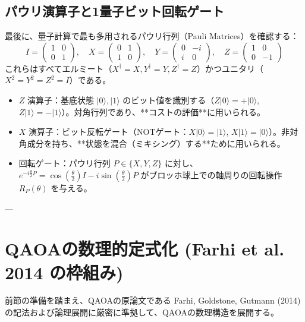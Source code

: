 \documentclass[11pt,a4paper]{ltjsarticle}
\theoremstyle{definition}
\theoremstyle{plain}
\theoremstyle{remark}
\newcommand{\ket}[1]{|#1\rangle}
\begin{document}
\subsection{パウリ演算子と1量子ビット回転ゲート}
最後に、量子計算で最も多用されるパウリ行列（Pauli Matrices）を確認する：
\begin{equation}
I = \begin{pmatrix} 1 & 0 \\ 0 & 1 \end{pmatrix}, \quad 
X = \begin{pmatrix} 0 & 1 \\ 1 & 0 \end{pmatrix}, \quad 
Y = \begin{pmatrix} 0 & -i \\ i & 0 \end{pmatrix}, \quad 
Z = \begin{pmatrix} 1 & 0 \\ 0 & -1 \end{pmatrix}
\end{equation}
これらはすべてエルミート（$X^\dagger = X, Y^\dagger = Y, Z^\dagger = Z$）かつユニタリ（$X^2 = Y^2 = Z^2 = I$）である。
\begin{itemize}
    \item $Z$ 演算子：基底状態 $\ket{0}, \ket{1}$ のビット値を識別する（$Z\ket{0}=+\ket{0}$, $Z\ket{1}=-\ket{1}$）。対角行列であり、**コストの評価**に用いられる。
    \item $X$ 演算子：ビット反転ゲート（NOTゲート：$X\ket{0}=\ket{1}$, $X\ket{1}=\ket{0}$）。非対角成分を持ち、**状態を混合（ミキシング）する**ために用いられる。
    \item 回転ゲート：パウリ行列 $P \in \{X, Y, Z\}$ に対し、$e^{-i \frac{\theta}{2} P} = \cos(\frac{\theta}{2}) I - i \sin(\frac{\theta}{2}) P$ がブロッホ球上での軸周りの回転操作 $R_P(\theta)$ を与える。
\end{itemize}

---

\section{QAOAの数理的定式化 (Farhi et al. 2014 の枠組み)}

前節の準備を踏まえ、QAOAの原論文である Farhi, Goldstone, Gutmann (2014) \cite{farhi2014quantum} の記法および論理展開に厳密に準拠して、QAOAの数理構造を展開する。
\end{document}

